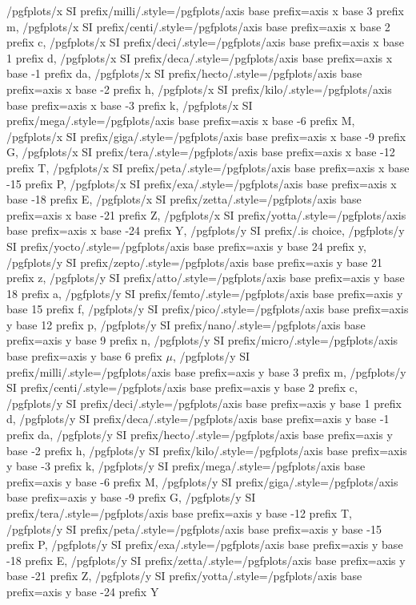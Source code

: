 {    /pgfplots/x SI prefix/milli/.style={/pgfplots/axis base prefix={axis x base 3 prefix m}},%
    /pgfplots/x SI prefix/centi/.style={/pgfplots/axis base prefix={axis x base 2 prefix c}},%
    /pgfplots/x SI prefix/deci/.style={/pgfplots/axis base prefix={axis x base 1 prefix d}},%
    /pgfplots/x SI prefix/deca/.style={/pgfplots/axis base prefix={axis x base -1 prefix da}},%
    /pgfplots/x SI prefix/hecto/.style={/pgfplots/axis base prefix={axis x base -2 prefix h}},%
    /pgfplots/x SI prefix/kilo/.style={/pgfplots/axis base prefix={axis x base -3 prefix k}},%
    /pgfplots/x SI prefix/mega/.style={/pgfplots/axis base prefix={axis x base -6 prefix M}},%
    /pgfplots/x SI prefix/giga/.style={/pgfplots/axis base prefix={axis x base -9 prefix G}},%
    /pgfplots/x SI prefix/tera/.style={/pgfplots/axis base prefix={axis x base -12 prefix T}},%
    /pgfplots/x SI prefix/peta/.style={/pgfplots/axis base prefix={axis x base -15 prefix P}},%
    /pgfplots/x SI prefix/exa/.style={/pgfplots/axis base prefix={axis x base -18 prefix E}},%
    /pgfplots/x SI prefix/zetta/.style={/pgfplots/axis base prefix={axis x base -21 prefix Z}},%
    /pgfplots/x SI prefix/yotta/.style={/pgfplots/axis base prefix={axis x base -24 prefix Y}},%
    /pgfplots/y SI prefix/.is choice,%
    /pgfplots/y SI prefix/yocto/.style={/pgfplots/axis base prefix={axis y base 24 prefix y}},%
    /pgfplots/y SI prefix/zepto/.style={/pgfplots/axis base prefix={axis y base 21 prefix z}},%
    /pgfplots/y SI prefix/atto/.style={/pgfplots/axis base prefix={axis y base 18 prefix a}},%
    /pgfplots/y SI prefix/femto/.style={/pgfplots/axis base prefix={axis y base 15 prefix f}},%
    /pgfplots/y SI prefix/pico/.style={/pgfplots/axis base prefix={axis y base 12 prefix p}},%
    /pgfplots/y SI prefix/nano/.style={/pgfplots/axis base prefix={axis y base 9 prefix n}},%
    /pgfplots/y SI prefix/micro/.style={/pgfplots/axis base prefix={axis y base 6 prefix $\mu$}},%
    /pgfplots/y SI prefix/milli/.style={/pgfplots/axis base prefix={axis y base 3 prefix m}},%
    /pgfplots/y SI prefix/centi/.style={/pgfplots/axis base prefix={axis y base 2 prefix c}},%
    /pgfplots/y SI prefix/deci/.style={/pgfplots/axis base prefix={axis y base 1 prefix d}},%
    /pgfplots/y SI prefix/deca/.style={/pgfplots/axis base prefix={axis y base -1 prefix da}},%
    /pgfplots/y SI prefix/hecto/.style={/pgfplots/axis base prefix={axis y base -2 prefix h}},%
    /pgfplots/y SI prefix/kilo/.style={/pgfplots/axis base prefix={axis y base -3 prefix k}},%
    /pgfplots/y SI prefix/mega/.style={/pgfplots/axis base prefix={axis y base -6 prefix M}},%
    /pgfplots/y SI prefix/giga/.style={/pgfplots/axis base prefix={axis y base -9 prefix G}},%
    /pgfplots/y SI prefix/tera/.style={/pgfplots/axis base prefix={axis y base -12 prefix T}},%
    /pgfplots/y SI prefix/peta/.style={/pgfplots/axis base prefix={axis y base -15 prefix P}},%
    /pgfplots/y SI prefix/exa/.style={/pgfplots/axis base prefix={axis y base -18 prefix E}},%
    /pgfplots/y SI prefix/zetta/.style={/pgfplots/axis base prefix={axis y base -21 prefix Z}},%
    /pgfplots/y SI prefix/yotta/.style={/pgfplots/axis base prefix={axis y base -24 prefix Y}}%
}


